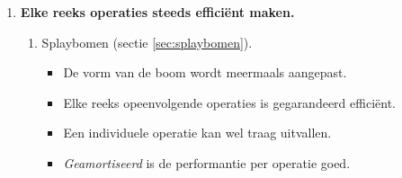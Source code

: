 \begin{itemize}
\begin{enumerate}
\begin{enumerate}
\begin{itemize}
            \end{itemize}
            \item 2-3-bomen (figuur \ref{fig:2-3-tree}).
            \begin{figure}[ht]
                \centering
                \texttt{[image: 2-3-tree]}
                \caption{Een 2-3-boom.}
                \label{fig:2-3-tree}
            \end{figure}
            \begin{itemize}
                \item Elke knoop heeft 2 of 3 kinderen en dus 1 of 2 sleutels.
                \item Elk blad heeft dezelfde diepte.
                \item Bij toevoegen of verwijderen wordt het ideale evenwicht behouden door het aantal kinderen van de knopen te manipuleren.
            \end{itemize}
            \item 2-3-4-bomen.
            \begin{itemize}
                \item Analoog aan een 2-3-boom, maar elke knoop heeft 2, 3 of 4 kinderen.
                \alert Per knoop moet er plaats voorzien zijn voor 3 sleutels, wat onnodig veel geheugen vraagt.
            \end{itemize}
            \item Rood-zwarte bomen (sectie \ref{sec:rood-zwarte bomen}).
        \end{enumerate}

        \item \textbf{Elke reeks operaties steeds efficiënt maken.}
        \begin{enumerate}
            \item Splaybomen (sectie \ref{sec:splaybomen}).
            \begin{itemize}
                \item De vorm van de boom wordt meermaals aangepast.
                \item Elke reeks opeenvolgende operaties is gegarandeerd efficiënt.
                \item Een individuele operatie kan wel traag uitvallen.
                \item \textit{Geamortiseerd} is de performantie per operatie goed.
            \end{itemize}
        \end{enumerate}


\end{enumerate}
\end{itemize}
